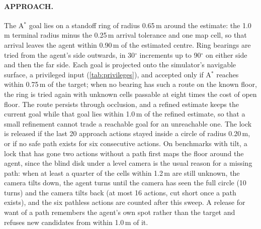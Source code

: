 \documentclass[10pt]{article}
\begin{document}
\paragraph{APPROACH.}
The A$^*$ goal lies on a standoff ring of radius 0.65\,m around the estimate: the 1.0\,m terminal radius minus the
0.25\,m arrival tolerance and one map cell, so that arrival leaves the agent within 0.90\,m of the estimated centre.
Ring bearings are tried from the agent's side outwards, in 30$^\circ$ increments up to 90$^\circ$ on either side and
then the far side. Each goal is projected onto the simulator's navigable surface, a privileged input
(\cref{tab:privileges}), and accepted only if A$^*$ reaches within 0.75\,m of the target; when no bearing has such a
route on the known floor, the ring is tried again with unknown cells passable at eight times the cost of open floor.
The route persists through
occlusion, and a refined estimate keeps the current goal while that goal lies within 1.0\,m of the refined estimate,
so that a small refinement cannot trade a reachable goal for an unreachable one. The lock is released if the last 20
approach actions stayed inside a circle of radius 0.20\,m, or if no safe path exists for six consecutive actions. On
benchmarks with tilt, a lock that has gone two actions without a path first maps the floor around the agent, since the
blind disk under a level camera is the usual reason for a missing path: when at least a quarter of the cells within
1.2\,m are still unknown, the camera tilts down, the agent turns until the camera has seen the full circle (10 turns)
and the camera tilts back (at most 16 actions, cut short once a path exists), and the six pathless actions are counted after this sweep. A release for want
of a path remembers the agent's own spot rather than the target and refuses new candidates from within 1.0\,m of it.
\end{document}
